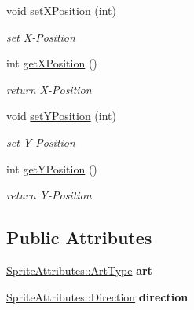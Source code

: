 \begin{DoxyCompactItemize}
\mbox{\label{class_game_sprite_adcd973ba50bc01f1a5a8e81d7e468be3}} 
void \mbox{\hyperlink{class_game_sprite_adcd973ba50bc01f1a5a8e81d7e468be3}{set\+X\+Position}} (int)
\begin{DoxyCompactList}\small\item\em set X-\/\+Position \end{DoxyCompactList}\item 
\mbox{\label{class_game_sprite_adf371cf5b8636f7cfd8cb998460f7053}} 
int \mbox{\hyperlink{class_game_sprite_adf371cf5b8636f7cfd8cb998460f7053}{get\+X\+Position}} ()
\begin{DoxyCompactList}\small\item\em return X-\/\+Position \end{DoxyCompactList}\item 
\mbox{\label{class_game_sprite_a31f481d89973565bb2d0d55d0600c266}} 
void \mbox{\hyperlink{class_game_sprite_a31f481d89973565bb2d0d55d0600c266}{set\+Y\+Position}} (int)
\begin{DoxyCompactList}\small\item\em set Y-\/\+Position \end{DoxyCompactList}\item 
\mbox{\label{class_game_sprite_aea645d5397fc4cdbd386e3133e33a802}} 
int \mbox{\hyperlink{class_game_sprite_aea645d5397fc4cdbd386e3133e33a802}{get\+Y\+Position}} ()
\begin{DoxyCompactList}\small\item\em return Y-\/\+Position \end{DoxyCompactList}\end{DoxyCompactItemize}
\subsection*{Public Attributes}
\begin{DoxyCompactItemize}
\item 
\mbox{\label{class_game_sprite_ae05d2bd0e016b9d515a6275292707b71}} 
\mbox{\hyperlink{namespace_sprite_attributes_afb5447c311bc29f0ce8ddfd025c6e998}{Sprite\+Attributes\+::\+Art\+Type}} {\bfseries art}
\item 
\mbox{\label{class_game_sprite_af888e99172d7ea317550147f64da755c}} 
\mbox{\hyperlink{namespace_sprite_attributes_a81213e7721058c470f8001d9d7351608}{Sprite\+Attributes\+::\+Direction}} {\bfseries direction}
\end{DoxyCompactItemize}


